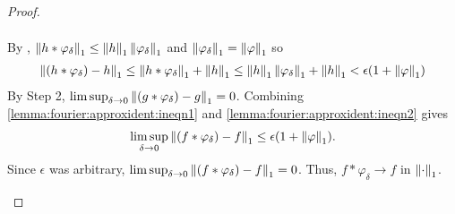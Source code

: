 \begin{proof}
\begin{step}[Proof of $3$]
\begin{align}
    \end{align}
    By , $\left\lVert h \ast \varphi_\delta\right\rVert_1 \leq \left\lVert h\right\rVert_1 \left\lVert\varphi_\delta\right\rVert_1$ and $\left\lVert\varphi_\delta\right\rVert_1 = \left\lVert\varphi\right\rVert_1$ so  \begin{align}
        \label{lemma:fourier:approxident:ineqn2}
         \left\lVert(h \ast \varphi_\delta) - h\right\rVert_1 \leq \left\lVert h \ast \varphi_\delta\right\rVert_1 + \left\lVert h\right\rVert_1 \leq  \left\lVert h\right\rVert_1 \left\lVert\varphi_\delta\right\rVert_1 + \left\lVert h\right\rVert_1 < \epsilon  (1 + \left\lVert\varphi\right\rVert_1)
    \end{align}
    By Step 2, $\limsup_{\delta \to 0} \left\lVert(g \ast \varphi_\delta) - g\right\rVert_1 = 0$. Combining \ref{lemma:fourier:approxident:ineqn1} and \ref{lemma:fourier:approxident:ineqn2} gives \begin{align*}
        \limsup_{\delta \to 0} \left\lVert(f \ast \varphi_\delta) - f \right\rVert_1  \leq \epsilon  (1 + \left\lVert\varphi\right\rVert_1).
    \end{align*}
    Since $\epsilon$ was arbitrary, $\limsup_{\delta \to 0} \left\lVert(f \ast \varphi_\delta) - f \right\rVert_1 = 0$. Thus, $f \ast \varphi_\delta \to f$ in $\left\lVert\cdot\right\rVert_1$.
\end{step}
\end{proof}